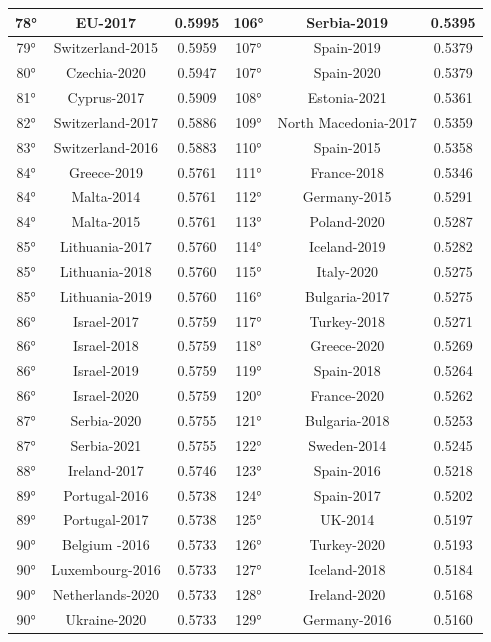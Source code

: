 \documentclass[a4paper,12pt, openright]{report}
\begin{document}
\begin{longtable}[c]{|c|c|c|c|c|c|}
    \hline
    78° & EU-2017  & 0.5995 & 106° & Serbia-2019 & 0.5395 \\
    \hline
    79° & Switzerland-2015 & 0.5959 & 107° & Spain-2019 & 0.5379 \\
    \hline
    80° & Czechia-2020 & 0.5947 & 107° & Spain-2020  & 0.5379 \\
    \hline
    81° & Cyprus-2017 & 0.5909 & 108° & Estonia-2021 & 0.5361 \\
    \hline
    82° & Switzerland-2017 & 0.5886 & 109° & North Macedonia-2017 & 0.5359 \\
    \hline
    83° & Switzerland-2016 & 0.5883 & 110° & Spain-2015 & 0.5358 \\ 
    \hline
    84° & Greece-2019  & 0.5761 & 111° & France-2018 & 0.5346 \\ 
    \hline
    84° & Malta-2014 & 0.5761 & 112° & Germany-2015 & 0.5291 \\ 
    \hline
    84° & Malta-2015 & 0.5761 & 113° & Poland-2020  & 0.5287 \\ 
    \hline
    85° & Lithuania-2017 & 0.5760 & 114° & Iceland-2019 & 0.5282 \\ 
    \hline
    85° & Lithuania-2018 & 0.5760 & 115° & Italy-2020 & 0.5275 \\ 
    \hline
    85° & Lithuania-2019 & 0.5760 & 116° & Bulgaria-2017 & 0.5275 \\ 
    \hline
    86° & Israel-2017  & 0.5759 & 117° & Turkey-2018 & 0.5271 \\ 
    \hline
    86° & Israel-2018 & 0.5759 & 118° & Greece-2020 & 0.5269 \\
    \hline
    86° & Israel-2019 & 0.5759 &  119° & Spain-2018  & 0.5264 \\ 
    \hline
    86° & Israel-2020 & 0.5759 & 120° & France-2020 & 0.5262 \\ 
    \hline
    87° & Serbia-2020 & 0.5755 & 121° & Bulgaria-2018 & 0.5253 \\ 
    \hline
    87° & Serbia-2021 & 0.5755 & 122° & Sweden-2014 & 0.5245 \\ 
    \hline
    88° & Ireland-2017  & 0.5746 & 123° & Spain-2016 & 0.5218 \\ 
    \hline
    89° & Portugal-2016 & 0.5738 & 124° & Spain-2017 & 0.5202 \\
    \hline
    89° & Portugal-2017 & 0.5738 &  125° & UK-2014  & 0.5197 \\ 
    \hline
    90° & Belgium -2016 & 0.5733 & 126° & Turkey-2020 & 0.5193 \\ 
    \hline
    90° & Luxembourg-2016 & 0.5733 & 127° & Iceland-2018 & 0.5184 \\ 
    \hline
    90° & Netherlands-2020 & 0.5733 & 128° & Ireland-2020 & 0.5168 \\
    \hline
    90° & Ukraine-2020  & 0.5733 &  129° & Germany-2016 & 0.5160 \\ 
\end{longtable}
\end{document}
